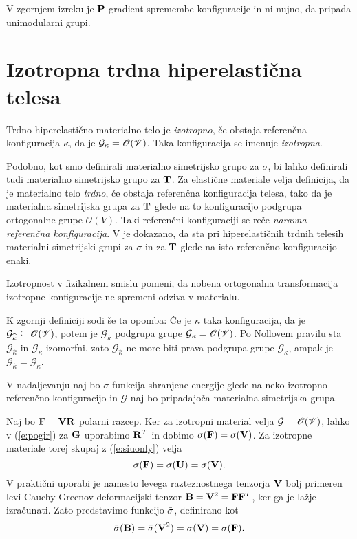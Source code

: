 V zgornjem izreku je $\mathbf P$ gradient spremembe konfiguracije in ni nujno,
da pripada unimodularni grupi.


\section{Izotropna trdna hiperelastična telesa}


\begin{definicija}
	Trdno hiperelastično materialno telo je \emph{izotropno}, če obstaja referenčna
	konfiguracija $\kappa$, da je $\mathcal{G}_{\kappa}=\mathscr{O}(\mathscr V)$. Taka konfiguracija
	se imenuje \emph{izotropna}.
\end{definicija}

\begin{opomba}
Podobno, kot smo definirali materialno simetrijsko grupo za $\sigma$, bi lahko
definirali tudi materialno simetrijsko grupo za $\mathbf T$. Za elastične
materiale velja definicija, da je materialno telo \emph{trdno}, če obstaja
referenčna konfiguracija telesa, tako da je materialna simetrijska grupa za $\mathbf T$
glede na to konfiguracijo podgrupa ortogonalne grupe $\mathscr{O}(V)$.
Taki referenčni konfiguraciji se reče \emph{naravna referenčna konfiguracija}. V \cite[str.~310]{truesdell} je dokazano,
da sta pri hiperelastičnih trdnih telesih materialni simetrijski grupi za $\sigma$ in za $\mathbf T$
glede na isto referenčno konfiguracijo enaki.
\end{opomba}

Izotropnost v fizikalnem smislu pomeni, da nobena ortogonalna transformacija izotropne
konfiguracije ne spremeni odziva v materialu.

K zgornji definiciji sodi še ta opomba: Če je $\widehat{\kappa}$ taka konfiguracija, da je
$\mathcal{G}_{\widehat{\kappa}}\subseteq\mathscr{O}(\mathscr V)$, potem je $\mathcal{G}_{\widehat{\kappa}}$
podgrupa grupe $\mathcal{G}_{\kappa}=\mathscr{O}(\mathscr V)$. Po Nollovem pravilu sta
$\mathcal{G}_{\widehat{\kappa}}$ in $\mathcal{G}_{\kappa}$ izomorfni, zato $\mathcal{G}_{\widehat{\kappa}}$
ne more biti prava podgrupa grupe $\mathcal{G}_{\kappa}$, ampak je
$\mathcal{G}_{\widehat{\kappa}}=\mathcal{G}_{\kappa}$.

V nadaljevanju naj bo $\sigma$ funkcija shranjene energije glede na neko izotropno referenčno konfiguracijo
in $\mathcal{G}$ naj bo pripadajoča materialna simetrijska grupa.

Naj bo $\mathbf F=\mathbf V\mathbf R$ polarni razcep. Ker za izotropni material velja $\mathcal{G}=\mathscr{O}(\mathscr V)$,
lahko v (\ref{e:pogir}) za $\mathbf G$ uporabimo $\mathbf R^T$ in dobimo $\sigma(\mathbf F)=\sigma(\mathbf V)$.
Za izotropne materiale torej skupaj z (\ref{e:siuonly}) velja
\[
	\sigma(\mathbf F)=\sigma(\mathbf U)=\sigma(\mathbf V).
\]
V praktični uporabi je namesto levega razteznostnega tenzorja $\mathbf V$ bolj primeren
levi Cauchy-Greenov deformacijski tenzor $\mathbf B=\mathbf V^2=\mathbf F\mathbf F^T$, ker
ga je lažje izračunati. Zato predstavimo funkcijo $\bar{\sigma}$, definirano kot
\begin{equation*} %
	\bar{\sigma}(\ten{B})=\bar{\sigma}(\ten{V}^2)=\sigma(\ten{V})=\sigma(\ten{F}).
\end{equation*}

